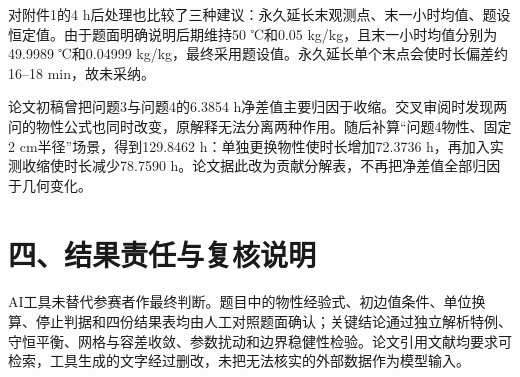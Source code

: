 \documentclass[zihao=-4,UTF8]{ctexart}
\begin{document}
对附件1的4 h后处理也比较了三种建议：永久延长末观测点、末一小时均值、题设恒定值。由于题面明确说明后期维持50 ℃和0.05 kg/kg，且末一小时均值分别为49.9989 ℃和0.04999 kg/kg，最终采用题设值。永久延长单个末点会使时长偏差约16--18 min，故未采纳。

论文初稿曾把问题3与问题4的6.3854 h净差值主要归因于收缩。交叉审阅时发现两问的物性公式也同时改变，原解释无法分离两种作用。随后补算“问题4物性、固定2 cm半径”场景，得到129.8462 h：单独更换物性使时长增加72.3736 h，再加入实测收缩使时长减少78.7590 h。论文据此改为贡献分解表，不再把净差值全部归因于几何变化。

\section*{四、结果责任与复核说明}
AI工具未替代参赛者作最终判断。题目中的物性经验式、初边值条件、单位换算、停止判据和四份结果表均由人工对照题面确认；关键结论通过独立解析特例、守恒平衡、网格与容差收敛、参数扰动和边界稳健性检验。论文引用文献均要求可检索，工具生成的文字经过删改，未把无法核实的外部数据作为模型输入。
\end{document}
